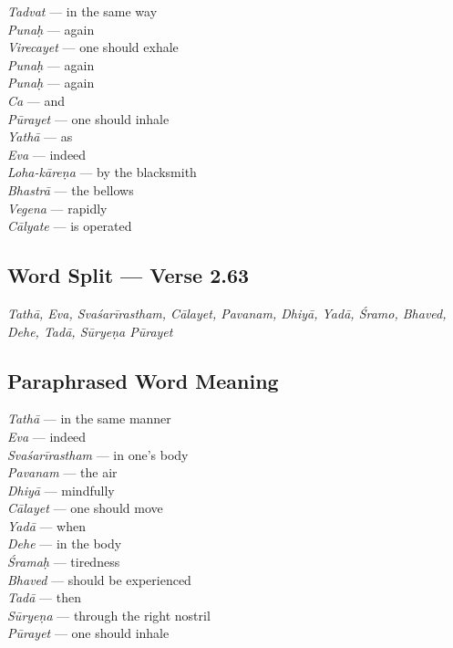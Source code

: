 \begin{multicols}{2}
\textit{Tadvat}  --- in the same way\\
\textit{Punaḥ} --- again\\
\textit{Virecayet} --- one should exhale\\
\textit{Punaḥ} --- again\\
\textit{Punaḥ} --- again\\
\textit{Ca} --- and\\
\textit{Pūrayet} --- one should inhale\\
\textit{Yathā} ---  as\\
\textit{Eva} --- indeed \\
\textit{Loha-kāreṇa} --- by the blacksmith\\
\textit{Bhastrā} --- the bellows\\
\textit{Vegena} --- rapidly\\
\textit{Cālyate} --- is operated
\end{multicols}

\subsection*{Word Split --- Verse 2.63}


\textit{Tathā, Eva, Svaśarīrastham, Cālayet, Pavanam, Dhiyā, Yadā, Śramo, Bhaved, Dehe, Tadā, Sūryeṇa Pūrayet}
\newpage
\subsection*{Paraphrased Word Meaning}


\begin{multicols}{2}
\textit{Tathā} --- in the same manner \\
\textit{Eva} --- indeed \\
\textit{Svaśarīrastham} --- in one’s body \\
\textit{Pavanam}  --- the air \\
\textit{Dhiyā} --- mindfully \\
\textit{Cālayet} --- one should move \\
\textit{Yadā} --- when \\
\textit{Dehe} --- in the body \\
\textit{Śramaḥ} --- tiredness \\
\textit{Bhaved}  --- should be experienced \\
\textit{Tadā} --- then\\
\textit{Sūryeṇa} --- through the right nostril \\
\textit{Pūrayet} --- one should inhale 
\end{multicols}

